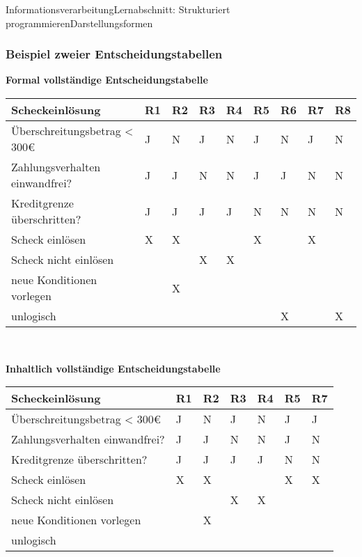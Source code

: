 \documentclass[11pt,oneside,openany,headings=optiontotoc,11pt,numbers=noenddot]{article}
\begin{document}
\begin{worksheet}{Informationsverarbeitung}{Lernabschnitt: Strukturiert programmieren}{Darstellungsformen}
		\subsubsection*{Beispiel zweier Entscheidungstabellen}
		\textbf{Formal vollständige Entscheidungstabelle}\\
		\begin{tabularx}{\textwidth}{|l||M|M|M|M|M|M|M|M|}
			\hline
			\textbf{Scheckeinlösung} & \textbf{R1} & \textbf{R2} & \textbf{R3} & \textbf{R4} & \textbf{R5} & \textbf{R6} & \textbf{R7} & \textbf{R8}\\
			\hline
			Überschreitungsbetrag < 300\euro & J & N & J & N & J & N & J & N\\
			\hline
			Zahlungsverhalten einwandfrei? & J & J & N & N & J & J & N & N\\
			\hline
			Kreditgrenze überschritten? & J & J & J & J & N & N & N & N\\
			\hline
			\hline
			Scheck einlösen & X & X & & & X & & X & \\
			\hline
			Scheck nicht einlösen & & & X & X & & & & \\
			\hline
			neue Konditionen vorlegen & & X & & & & & & \\
			\hline
			unlogisch & & & & & & X & & X \\
			\hline
		\end{tabularx}\\
		\par\noindent
		\textbf{Inhaltlich vollständige Entscheidungstabelle}\\
		\begin{tabularx}{\textwidth}{|l||M|M|M|M|M|M|}
			\hline
			\textbf{Scheckeinlösung} & \textbf{R1} & \textbf{R2} & \textbf{R3} & \textbf{R4} & \textbf{R5} & \textbf{R7}\\
			\hline
			Überschreitungsbetrag < 300\euro & J & N & J & N & J & J \\
			\hline
			Zahlungsverhalten einwandfrei? & J & J & N & N & J & N \\
			\hline
			Kreditgrenze überschritten? & J & J & J & J & N & N \\
			\hline
			\hline
			Scheck einlösen & X & X & & & X & X \\
			\hline
			Scheck nicht einlösen & & & X & X & & \\
			\hline
			neue Konditionen vorlegen & & X & & & & \\
			\hline
			unlogisch & & & & & & \\
			\hline
		\end{tabularx}\\

\end{worksheet}
\end{document}
